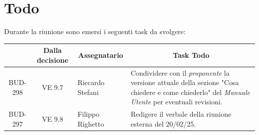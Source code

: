 

\section{Todo}

Durante la riunione sono emersi i seguenti task da svolgere:

\vspace{0.5cm}

\begin{table}[htbp]
\centering
{}
\begin{tabular}{|c|c|p{}|p{}|}
    \hline
    \rowcolor[gray]{0.75}
    \multicolumn{1}{|c|}{\textbf{Codice}} & \multicolumn{1}{|c|}{\textbf{Dalla decisione}} & \multicolumn{1}{|c|}{\textbf{Assegnatario}} & \multicolumn{1}{|c|}{\textbf{Task Todo}} \\
    \hline
    BUD-298 & VE 9.7 & Riccardo Stefani & Condividere con il \emph{proponente} la versione attuale della sezione
    "Cosa chiedere e come chiederlo" del \emph{Manuale Utente} per eventuali revisioni.\\
    \hline
    BUD-297 & VE 9.8 & Filippo Righetto & Redigere il verbale della riunione esterna del 20/02/25. \\
    \hline
\end{tabular}
\end{table}



